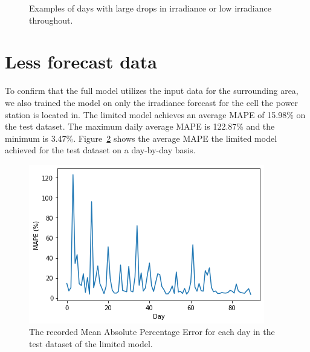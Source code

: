 \begin{figure}[ht!]
    \caption{Examples of days with large drops in irradiance or low irradiance throughout.
    \label{fig:full_high}}
\end{figure}




\clearpage
\section{Less forecast data}
To confirm that the full model utilizes the input data for the surrounding area, we also trained the model on only the irradiance forecast for the cell the power station is located in.
The limited model achieves an average MAPE of 15.98\% on the test dataset. The maximum daily average MAPE is 122.87\% and the minimum is 3.47\%. Figure~\ref{fig:days_less} shows the average MAPE the limited model achieved for the test dataset on a day-by-day basis.
\begin{figure}[ht!]
    \centering
    \includegraphics[scale=1]{imgs/graphs/less/days_single.png}
    \caption{The recorded Mean Absolute Percentage Error for each day in the test dataset of the limited model. 
    \label{fig:days_less}}
\end{figure}

\newpage
